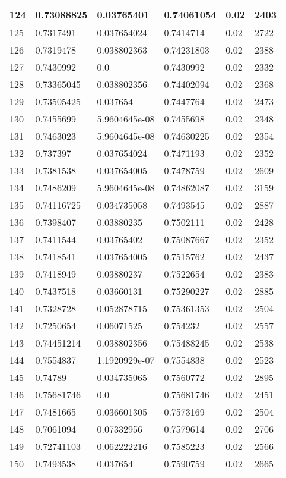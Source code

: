 \begin{longtable}{|l|l|l|l|l|l|}
124 & 0.73088825 & 0.03765401 & 0.74061054 & 0.02 & 2403 \\ \hline 
125 & 0.7317491 & 0.037654024 & 0.7414714 & 0.02 & 2722 \\ \hline 
126 & 0.7319478 & 0.038802363 & 0.74231803 & 0.02 & 2388 \\ \hline 
127 & 0.7430992 & 0.0 & 0.7430992 & 0.02 & 2332 \\ \hline 
128 & 0.73365045 & 0.038802356 & 0.74402094 & 0.02 & 2368 \\ \hline 
129 & 0.73505425 & 0.037654 & 0.7447764 & 0.02 & 2473 \\ \hline 
130 & 0.7455699 & 5.9604645e-08 & 0.7455698 & 0.02 & 2348 \\ \hline 
131 & 0.7463023 & 5.9604645e-08 & 0.74630225 & 0.02 & 2354 \\ \hline 
132 & 0.737397 & 0.037654024 & 0.7471193 & 0.02 & 2352 \\ \hline 
133 & 0.7381538 & 0.037654005 & 0.7478759 & 0.02 & 2609 \\ \hline 
134 & 0.7486209 & 5.9604645e-08 & 0.74862087 & 0.02 & 3159 \\ \hline 
135 & 0.74116725 & 0.034735058 & 0.7493545 & 0.02 & 2887 \\ \hline 
136 & 0.7398407 & 0.03880235 & 0.7502111 & 0.02 & 2428 \\ \hline 
137 & 0.7411544 & 0.03765402 & 0.75087667 & 0.02 & 2352 \\ \hline 
138 & 0.7418541 & 0.037654005 & 0.7515762 & 0.02 & 2437 \\ \hline 
139 & 0.7418949 & 0.03880237 & 0.7522654 & 0.02 & 2383 \\ \hline 
140 & 0.7437518 & 0.03660131 & 0.75290227 & 0.02 & 2885 \\ \hline 
141 & 0.7328728 & 0.052878715 & 0.75361353 & 0.02 & 2504 \\ \hline 
142 & 0.7250654 & 0.06071525 & 0.754232 & 0.02 & 2557 \\ \hline 
143 & 0.74451214 & 0.038802356 & 0.75488245 & 0.02 & 2538 \\ \hline 
144 & 0.7554837 & 1.1920929e-07 & 0.7554838 & 0.02 & 2523 \\ \hline 
145 & 0.74789 & 0.034735065 & 0.7560772 & 0.02 & 2895 \\ \hline 
146 & 0.75681746 & 0.0 & 0.75681746 & 0.02 & 2451 \\ \hline 
147 & 0.7481665 & 0.036601305 & 0.7573169 & 0.02 & 2504 \\ \hline 
148 & 0.7061094 & 0.07332956 & 0.7579614 & 0.02 & 2706 \\ \hline 
149 & 0.72741103 & 0.062222216 & 0.7585223 & 0.02 & 2566 \\ \hline 
150 & 0.7493538 & 0.037654 & 0.7590759 & 0.02 & 2665 \\ \hline 
\end{longtable}